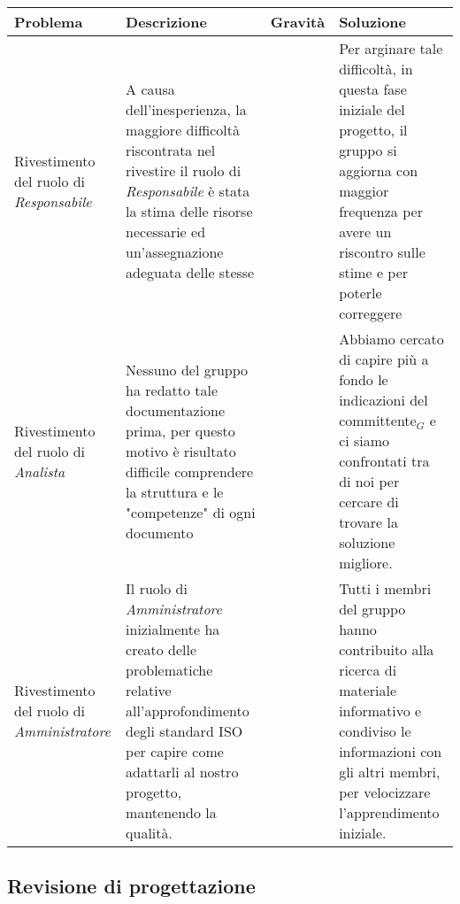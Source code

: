 {{{	\begin{center}
		\renewcommand{\arraystretch}{1.4}
		\begin{tabularx}{\textwidth}[c]{|p{}|p{5cm}|p{}|p{}|}
			\hline
			\rowcolor{airforceblue}
			\textbf{Problema} & \textbf{Descrizione} & \textbf{Gravità} & \textbf{Soluzione}\\
			\hline
			Rivestimento del ruolo di \textit{Responsabile} &A causa dell'inesperienza, la maggiore difficoltà riscontrata nel rivestire il ruolo di \textit{Responsabile} è stata la stima delle risorse necessarie ed un'assegnazione adeguata delle stesse & \centering2 & Per arginare tale difficoltà,  in questa fase iniziale del progetto, il gruppo si aggiorna con maggior frequenza per avere un riscontro sulle stime e per poterle correggere \\
			\hline
			Rivestimento del ruolo di \textit{Analista}& Nessuno del gruppo ha redatto tale documentazione prima, per questo motivo è risultato difficile comprendere la struttura e le "competenze" di ogni documento & \centering2 & Abbiamo cercato di capire più a fondo le indicazioni del committente$_G$ e ci siamo confrontati tra di noi per cercare di trovare la soluzione migliore. \\
			\hline
			Rivestimento del ruolo di \textit{Amministratore} & Il ruolo di \textit{Amministratore} inizialmente ha creato delle problematiche relative all'approfondimento degli standard ISO per capire come adattarli al nostro progetto, mantenendo la qualità. & \centering2 & Tutti i membri del gruppo hanno contribuito alla ricerca di materiale informativo e condiviso le informazioni con gli altri membri, per velocizzare l'apprendimento iniziale. \\
			\hline
		\end{tabularx}
	\end{center}

\subsection{Revisione di progettazione}\label{ValutazionePerIlMiglioramentoValutazioneSuiRuoliRevisioneDiProgettazione}

}}}
